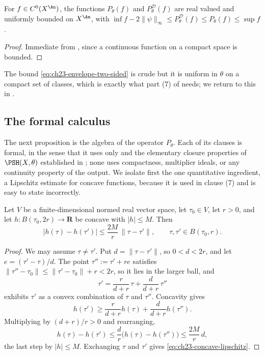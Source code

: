 \begin{corollary}\label{cor:ch23-continuous-finite}
For \(f\in C^0(X^{\An})\), the functions \(P_\theta(f)\) and
\(P^{\mathcal D}_\theta(f)\) are real valued and uniformly bounded on
\(X^{\An}\), with
\(\inf f-2\|\psi\|_\infty\le P^{\mathcal D}_\theta(f)\le P_\theta(f)\le\sup f\).
\end{corollary}

\begin{proof}
Immediate from , since a continuous
function on a compact space is bounded.
\end{proof}

The bound \eqref{eq:ch23-envelope-two-sided} is crude but it is uniform in
\(\theta\) on a compact set of classes, which is exactly what part (7) of
 needs; we return to this in
.

\subsection{The formal calculus}
\label{sec:ch23-formal-calculus}

The next proposition is the algebra of the operator \(P_\theta\).  Each of
its clauses is formal, in the sense that it uses only
 and the elementary closure properties of
\(\PSH(X,\theta)\) established in ; none
uses compactness, multiplier ideals, or any continuity property of the
output.  We isolate first the one quantitative ingredient, a Lipschitz
estimate for concave functions, because it is used in clause (7) and is easy
to state incorrectly.

\begin{lemma}
\label{lem:ch23-concave-lipschitz}
Let \(V\) be a finite-dimensional normed real vector space, let
\(\tau_0\in V\), let \(r>0\), and let
\(h:B(\tau_0,2r)\to\mathbf R\) be concave with \(|h|\leq M\).  Then
\begin{equation}\label{eq:ch23-concave-lipschitz}
 |h(\tau)-h(\tau')|\leq\frac{2M}{r}\,\|\tau-\tau'\|,
 \qquad \tau,\tau'\in B(\tau_0,r).
\end{equation}
\end{lemma}

\begin{proof}
We may assume \(\tau\ne\tau'\).  Put \(d=\|\tau-\tau'\|\), so \(0<d<2r\), and
let \(e=(\tau'-\tau)/d\).  The point \(\tau'':=\tau'+re\) satisfies
\(\|\tau''-\tau_0\|\leq\|\tau'-\tau_0\|+r<2r\), so it lies in the larger
ball, and
\[
 \tau'=\frac{r}{d+r}\,\tau+\frac{d}{d+r}\,\tau''
\]
exhibits \(\tau'\) as a convex combination of \(\tau\) and \(\tau''\).
Concavity gives
\[
 h(\tau')\geq\frac{r}{d+r}h(\tau)+\frac{d}{d+r}h(\tau'').
\]
Multiplying by \((d+r)/r>0\) and rearranging,
\[
 h(\tau)-h(\tau')
 \leq\frac{d}{r}\bigl(h(\tau)-h(\tau'')\bigr)
 \leq\frac{2M}{r}\,d ,
\]
the last step by \(|h|\leq M\).  Exchanging \(\tau\) and \(\tau'\) gives
\eqref{eq:ch23-concave-lipschitz}.
\end{proof}

